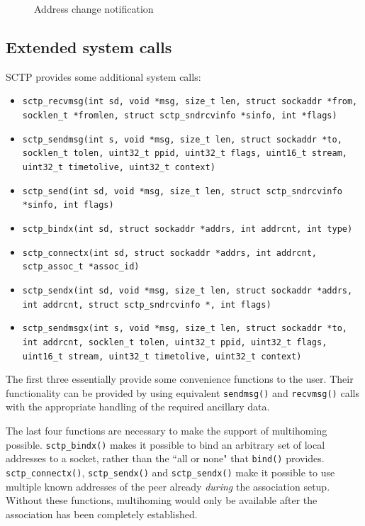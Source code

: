 \documentclass[conference]{IEEEtran}
\begin{document}
\begin{figure}

\caption{Address change notification}
\label{fig:paddr}
\end{figure}

\subsection{Extended system calls}
SCTP provides some additional system calls:
\begin{itemize}
 \item  \texttt{sctp\_recvmsg(int sd, void *msg, size\_t len, struct sockaddr *from, socklen\_t *fromlen, struct sctp\_sndrcvinfo *sinfo, int *flags)}
 \item  \texttt{sctp\_sendmsg(int s, void *msg, size\_t len, struct sockaddr *to, socklen\_t tolen, uint32\_t ppid, uint32\_t flags, uint16\_t stream, uint32\_t timetolive, uint32\_t context)}
 \item  \texttt{sctp\_send(int sd, void *msg, size\_t len, struct sctp\_sndrcvinfo *sinfo, int flags)}
 \item  \texttt{sctp\_bindx(int sd, struct sockaddr *addrs, int addrcnt, int type)}
 \item  \texttt{sctp\_connectx(int sd, struct sockaddr *addrs, int addrcnt, sctp\_assoc\_t *assoc\_id)}
 \item  \texttt{sctp\_sendx(int sd, void *msg, size\_t len, struct sockaddr *addrs, int addrcnt, struct sctp\_sndrcvinfo *, int flags)}
 \item  \texttt{sctp\_sendmsgx(int s, void *msg, size\_t len, struct sockaddr *to, int addrcnt, socklen\_t tolen, uint32\_t ppid, uint32\_t flags, uint16\_t stream, uint32\_t timetolive, uint32\_t context)}
\end{itemize}
The first three essentially provide some convenience functions to the user. Their functionality can be provided by
using equivalent  \texttt{sendmsg()} and \texttt{recvmsg()} calls with the appropriate handling of the required ancillary data.

The last four functions
are necessary to make the support of multihoming possible. \texttt{sctp\_bindx()} makes it
possible to bind an arbitrary set of local addresses to a socket, rather than the ``all or none"
that \texttt{bind()} provides. \texttt{sctp\_connectx()},
\texttt{sctp\_sendx()} and \texttt{sctp\_sendx()} make it possible to use multiple known addresses
of the peer already \emph{during} the association setup. Without these functions,
multihoming would only be available after the association has been completely established.
\end{document}
